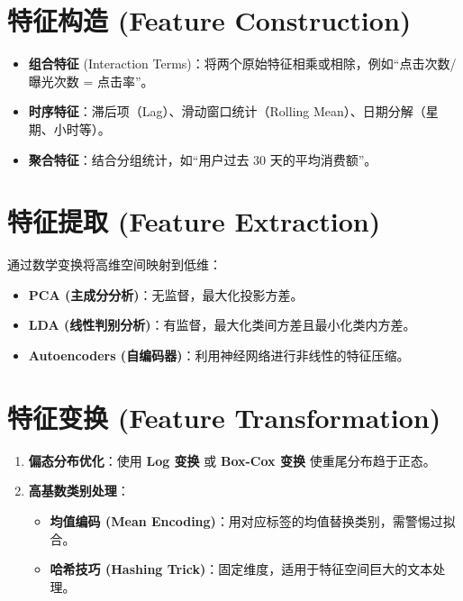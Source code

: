 \documentclass[12pt, a4paper]{article}
\begin{document}
\section{特征构造 (Feature Construction)}
\begin{itemize}
    \item \textbf{组合特征} (Interaction Terms)：将两个原始特征相乘或相除，例如“点击次数/曝光次数 = 点击率”。
    \item \textbf{时序特征}：滞后项（Lag）、滑动窗口统计（Rolling Mean）、日期分解（星期、小时等）。
    \item \textbf{聚合特征}：结合分组统计，如“用户过去 30 天的平均消费额”。
\end{itemize}

\section{特征提取 (Feature Extraction)}
通过数学变换将高维空间映射到低维：
\begin{itemize}
    \item \textbf{PCA (主成分分析)}：无监督，最大化投影方差。
    \item \textbf{LDA (线性判别分析)}：有监督，最大化类间方差且最小化类内方差。
    \item \textbf{Autoencoders (自编码器)}：利用神经网络进行非线性的特征压缩。
\end{itemize}

\section{特征变换 (Feature Transformation)}
\begin{enumerate}
    \item \textbf{偏态分布优化}：使用 \textbf{Log 变换} 或 \textbf{Box-Cox 变换} 使重尾分布趋于正态。
    \item \textbf{高基数类别处理}：
        \begin{itemize}
            \item \textbf{均值编码 (Mean Encoding)}：用对应标签的均值替换类别，需警惕过拟合。
            \item \textbf{哈希技巧 (Hashing Trick)}：固定维度，适用于特征空间巨大的文本处理。
        \end{itemize}
\end{enumerate}
\end{document}
